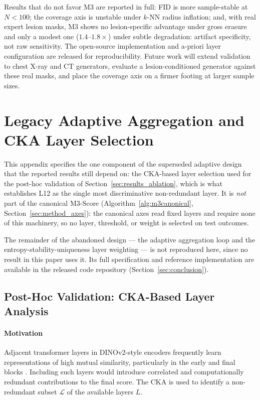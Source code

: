 \documentclass[lettersize,journal]{IEEEtran}
\begin{document}
Results that do not favor M3 are reported in full: FID
is more sample-stable at $N < 100$; the coverage axis is unstable under
$k$-NN radius inflation; and, with real expert lesion masks, M3 shows no
lesion-specific advantage under gross erasure and only a modest one
($1.4$--$1.8\times$) under subtle degradation: artifact specificity, not raw
sensitivity. The open-source implementation and a-priori layer configuration
are released for reproducibility. Future work will extend validation to chest
X-ray and CT generators, evaluate a lesion-conditioned generator against these
real masks, and place the coverage axis on a firmer footing at larger sample
sizes.

\appendices
\section{Legacy Adaptive Aggregation and CKA Layer Selection}
\label{app:legacy}
This appendix specifies the one component of the superseded adaptive design
that the reported results still depend on: the CKA-based layer selection used
for the post-hoc validation of Section~\ref{sec:results_ablation}, which is
what establishes L12 as the single most discriminative non-redundant layer.
It is \emph{not} part of the canonical M3-Score
(Algorithm~\ref{alg:m3canonical}, Section~\ref{sec:method_axes}): the canonical
axes read fixed layers and require none of this machinery, so no layer,
threshold, or weight is selected on test outcomes.

The remainder of the abandoned design --- the adaptive aggregation loop and the
entropy-stability-uniqueness layer weighting --- is not reproduced here, since
no result in this paper uses it. Its full specification and reference
implementation are available in the released code repository
(Section~\ref{sec:conclusion}).

\subsection{Post-Hoc Validation: CKA-Based Layer Analysis}
\label{sec:method_cka}

\paragraph{Motivation}
Adjacent transformer layers in DINOv2-style encoders frequently learn representations of high mutual similarity, particularly in the early and final blocks \cite{kornblith2019cka}.
Including such layers would introduce correlated and computationally redundant contributions to the final score.
The CKA \cite{kornblith2019cka} is used to identify a non-redundant subset $\mathcal{L}$ of the available layers $L$.
\end{document}
